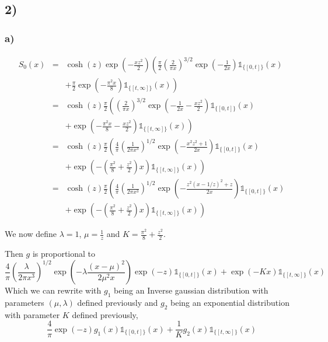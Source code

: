 \subsection*{2)}
\subsubsection*{a)}

\begin{eqnarray*}
	S_0(x) &=& \cosh(z)\exp\left(-\frac{xz^2}{2}\right)\left( \frac{\pi}{2} \left( \frac{2}{\pi x} \right)^{3/2} \exp\left( -\frac{1}{2x}  \right) \mathbb{1}_{\{[0,t]\}}(x)\right.\\
&& \left.+ \frac{\pi}{2} \exp\left( -\frac{\pi^2 x}{8}  \right) \mathbb{1}_{\{[t,\infty]\}}(x)\right)\\
&=& \cosh(z)\frac{\pi}{2} \left( \left( \frac{2}{\pi x} \right)^{3/2} \exp\left( -\frac{1}{2x} -\frac{xz^2}{2} \right) \mathbb{1}_{\{[0,t]\}}(x)\right.\\
&& \left.+ \exp\left( -\frac{\pi^2 x}{8}  -\frac{xz^2}{2}\right) \mathbb{1}_{\{[t,\infty]\}}(x)\right)\\
&=& \cosh(z)\frac{\pi}{2} \left( \frac{4}{\pi} \left( \frac{1}{2\pi x^3} \right)^{1/2} \exp\left( -\frac{x^2z^2 + 1}{2x} \right) \mathbb{1}_{\{[0,t]\}}(x)\right.\\
&& \left.+ \exp\left( -\left(\frac{\pi^2}{8}+\frac{z^2}{2}\right)x\right) \mathbb{1}_{\{[t,\infty]\}}(x)\right)\\
&=& \cosh(z)\frac{\pi}{2} \left( \frac{4}{\pi} \left( \frac{1}{2\pi x^3} \right)^{1/2} \exp\left( -\frac{z^2(x - 1/z)^2 + z}{2x} \right) \mathbb{1}_{\{[0,t]\}}(x)\right.\\
&& \left.+ \exp\left( -\left(\frac{\pi^2}{8}+\frac{z^2}{2}\right)x\right) \mathbb{1}_{\{[t,\infty]\}}(x)\right)
\end{eqnarray*}


We now define $\lambda = 1$, $\mu = \frac{1}{z}$ and $K = \frac{\pi^2}{8} + \frac{z^2}{2}$.

Then $g$ is proportional to 
\[\frac{4}{\pi} \left( \frac{\lambda}{2\pi x^3} \right)^{1/2} \exp\left( -\lambda \frac{(x - \mu)^2}{2\mu^2 x} \right) \exp(-z) \mathbb{1}_{\{[0,t]\}}(x)+ \exp\left( -Kx\right) \mathbb{1}_{\{[t,\infty]\}}(x)\]
Which we can rewrite with $g_1$ being an Inverse gaussian distribution with parameters $(\mu,\lambda)$ defined previously and $g_2$ being an exponential distribution with parameter $K$ defined previously,
\[\frac{4}{\pi}\exp(-z) g_1(x) \mathbb{1}_{\{[0,t]\}}(x)+ \frac{1}{K}g_2(x)\mathbb{1}_{\{[t,\infty]\}}(x)\]

